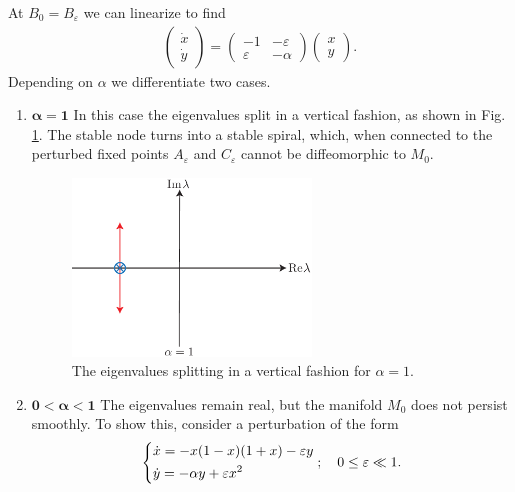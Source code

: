 \begin{ex}[]
	At $B_0 = B_{\varepsilon}$ we can linearize to find
	\begin{align}
		\begin{pmatrix}
			\dot{x} \\ \dot{y}
		\end{pmatrix}
		 = 
		 \begin{pmatrix}
			 -1 & - \varepsilon \\
			 \varepsilon & -\alpha 
		 \end{pmatrix}
		 \begin{pmatrix}
		 	x \\ y
		 \end{pmatrix}
		. 
	\end{align}
Depending on $\alpha $ we differentiate two cases.
\begin{enumerate}
	\item $\bm{\alpha =1} $ In this case the eigenvalues split in a vertical fashion, as shown in Fig. \ref{fig:eigv_vertical_split}. The stable node turns into a stable spiral, which, when connected to the perturbed fixed points $A_{\varepsilon}$ and $C_{\varepsilon}$ cannot be diffeomorphic to $M_0$.
		\begin{figure}[h!]
			\centering
			\includegraphics[width=0.6\textwidth]{figures/ch9/11_5vertical_split.pdf}
			\caption{The eigenvalues splitting in a vertical fashion for $\alpha=1$.}
			\label{fig:eigv_vertical_split}
		\end{figure}
	\item $\bm{0<\alpha<1}$ The eigenvalues remain real, but the manifold $M_0$ does not persist smoothly. To show this, consider a perturbation of the form
		\begin{align}
		\begin{dcases}
			\dot{x} = -x(1-x)(1+x) -\varepsilon y \\
			\dot{y} = - \alpha y + \varepsilon x^2
		\end{dcases}
		;\quad 0 \leq \varepsilon \ll 1.

\end{align}
\end{enumerate}
\end{ex}
